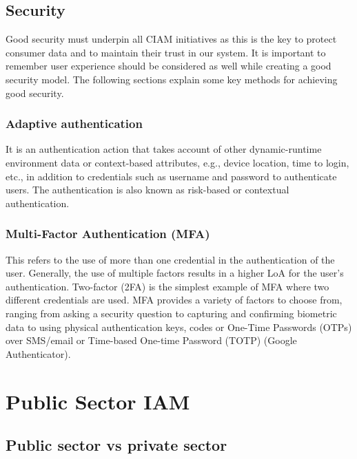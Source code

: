 \hypertarget{security}{%
\section{Security}\label{security}}

Good security must underpin all CIAM initiatives as this is the key to
protect consumer data and to maintain their trust in our system. It is
important to remember user experience should be considered as well while
creating a good security model. The following sections explain some key
methods for achieving good security.

\hypertarget{adaptive-authentication}{%
\subsection{Adaptive authentication}\label{adaptive-authentication}}

It is an authentication action that takes account of other
dynamic-runtime environment data or context-based attributes, e.g.,
device location, time to login, etc., in addition to credentials such as
username and password to authenticate users. The authentication is also
known as risk-based or contextual authentication.

\hypertarget{multi-factor-authentication-mfa}{%
\subsection{Multi-Factor Authentication
(MFA)}\label{multi-factor-authentication-mfa}}

This refers to the use of more than one credential in the authentication
of the user. Generally, the use of multiple factors results in a higher
LoA for the user's authentication. Two-factor (2FA) is the simplest
example of MFA where two different credentials are used. MFA provides a
variety of factors to choose from, ranging from asking a security
question to capturing and confirming biometric data to using physical
authentication keys, codes or One-Time Passwords (OTPs) over SMS/email
or Time-based One-time Password (TOTP) (Google Authenticator).~

\hypertarget{public-sector-iam}{%
\chapter{Public Sector IAM}\label{public-sector-iam}}

\hypertarget{public-sector-vs-private-sector}{%
\section{Public sector vs private
sector}\label{public-sector-vs-private-sector}}


